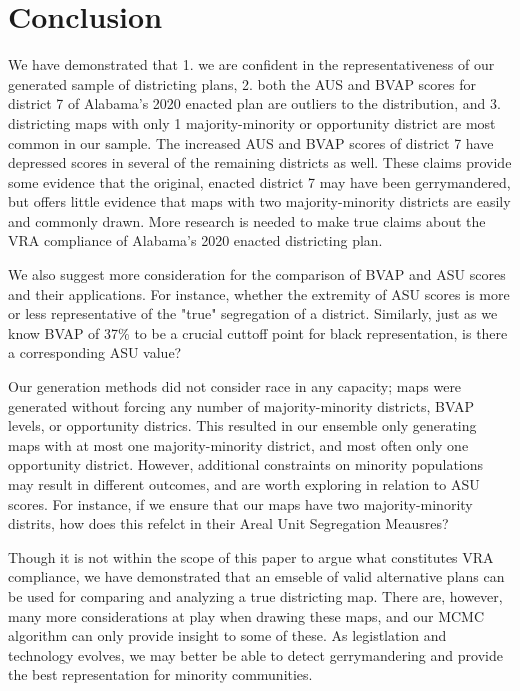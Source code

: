 \documentclass{article}
\begin{document}
\section{Conclusion}
We have demonstrated that 1. we are confident in the representativeness of our generated sample of districting plans, 2. both the AUS and BVAP scores for district 7 of Alabama's 2020 enacted plan are outliers to the distribution, and 3. districting maps with only 1 majority-minority or opportunity district are most common in our sample. The increased AUS and BVAP scores of district 7 have depressed scores in several of the remaining districts as well. These claims provide some evidence that the original, enacted district 7 may have been gerrymandered, but offers little evidence that maps with two majority-minority districts are easily and commonly drawn. More research is needed to make true claims about the VRA compliance of Alabama's 2020 enacted districting plan. 
\par
We also suggest more consideration for the comparison of BVAP and ASU scores and their applications. For instance, whether the extremity of ASU scores is more or less representative of the "true" segregation of a district. Similarly, just as we know BVAP of 37\% to be a crucial cuttoff point for black representation, is there a corresponding ASU value?
\par 
Our generation methods did not consider race in any capacity; maps were generated without forcing any number of majority-minority districts, BVAP levels, or opportunity districs. This resulted in our ensemble only generating maps with at most one majority-minority district, and most often only one opportunity district. However, additional constraints on minority populations may result in different outcomes, and are worth exploring in relation to ASU scores. For instance, if we ensure that our maps have two majority-minority distrits, how does this refelct in their Areal Unit Segregation Meausres?
\par
Though it is not within the scope of this paper to argue what constitutes VRA compliance, we have demonstrated that an emseble of valid alternative plans can be used for comparing and analyzing a true districting map. There are, however, many more considerations at play when drawing these maps, and our MCMC algorithm can only provide insight to some of these. As legistlation and technology evolves, we may better be able to detect gerrymandering and provide the best representation for minority communities.
\end{document}
